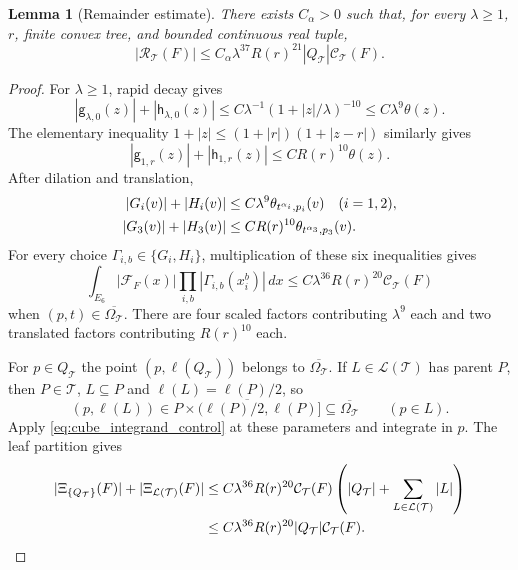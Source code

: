 \documentclass[12pt,reqno]{amsart}
\theoremstyle{plain}
\newtheorem{lemma}[theorem]{Lemma}
\theoremstyle{definition}
\theoremstyle{remark}
\numberwithin{equation}{section}
\newcommand{\T}{\mathcal T}
\newcommand{\g}{\mathsf g}
\newcommand{\h}{\mathsf h}
\newcommand{\dd}{\,d}
\begin{document}
\begin{lemma}[Remainder estimate]\label{lem:remainder}
There exists $C_\alpha>0$ such that, for every $\lambda\ge1$, $r$,
finite convex tree, and bounded continuous real tuple,
\begin{equation}\label{eq:remainder}
 |\mathcal R_\T(F)|\le C_\alpha\lambda^{37}R(r)^{21}
                        |Q_\T|\mathcal C_\T(F).
\end{equation}
\end{lemma}
\begin{proof}
For $\lambda\ge1$, rapid decay gives
\[
 |\g_{\lambda,0}(z)|+|\h_{\lambda,0}(z)|
 \le C\lambda^{-1}(1+|z|/\lambda)^{-10}
 \le C\lambda^9\theta(z).
\]
The elementary inequality
$1+|z|\le(1+|r|)(1+|z-r|)$ similarly gives
\[
 |\g_{1,r}(z)|+|\h_{1,r}(z)|\le CR(r)^{10}\theta(z).
\]
After dilation and translation,
\begin{align}
 |G_i(v)|+|H_i(v)|&\le C\lambda^9
                      \theta_{t^{\alpha_i},p_i}(v)\quad(i=1,2),\notag\\
 |G_3(v)|+|H_3(v)|&\le CR(r)^{10}
                      \theta_{t^{\alpha_3},p_3}(v).
                                               \label{eq:cube_kernel_domination}
\end{align}
For every choice $\Gamma_{i,b}\in\{G_i,H_i\}$, multiplication of
these six inequalities gives
\begin{equation}\label{eq:cube_integrand_control}
 \int_{E_6}|\mathcal F_F(x)|\prod_{i,b}|\Gamma_{i,b}(x_i^b)|\dd x
 \le C\lambda^{36}R(r)^{20}\mathcal C_\T(F)
\end{equation}
when $(p,t)\in\overline{\Omega_\T}$. There are four scaled factors
contributing $\lambda^9$ each and two translated factors contributing
$R(r)^{10}$ each.

For $p\in Q_\T$ the point $(p,\ell(Q_\T))$ belongs to
$\overline{\Omega_\T}$. If $L\in\mathcal L(\T)$ has parent $P$,
then $P\in\T$, $L\subseteq P$ and $\ell(L)=\ell(P)/2$, so
\[
 (p,\ell(L))\in
 \overline{P\times(\ell(P)/2,\ell(P)]}
       \subseteq\overline{\Omega_\T}\qquad(p\in L).
\]
Apply \eqref{eq:cube_integrand_control} at these parameters and
integrate in $p$. The leaf partition gives
\begin{align}
 |\Xi_{\{Q_\T\}}(F)|+|\Xi_{\mathcal L(\T)}(F)|
 &\le C\lambda^{36}R(r)^{20}\mathcal C_\T(F)
                      \left(|Q_\T|+\sum_{L\in\mathcal L(\T)}|L|\right)
                                                       \notag\\
 &\le C\lambda^{36}R(r)^{20}|Q_\T|\mathcal C_\T(F).
                                                 \label{eq:endpoint_bound}
\end{align}


\end{proof}
\end{document}
